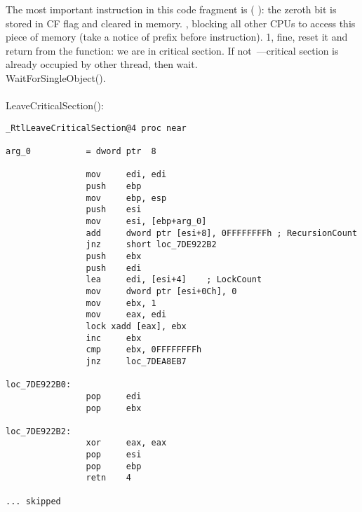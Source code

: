 {The most important instruction in this code fragment is}  
( ): 
{the zeroth bit is stored in CF flag and cleared in memory}.
, 
{blocking all other CPUs to access this piece of memory 
(take a notice of  prefix before  instruction).}
   1, 
{fine, reset it and return from the function: we are in critical section}.
{If not~---critical section is already occupied by other thread, then wait}. \\
 WaitForSingleObject(). \\
\\
 LeaveCriticalSection():

\begin{lstlisting}[caption=Windows 2008/ntdll.dll/x86 (begin)]
_RtlLeaveCriticalSection@4 proc near

arg_0           = dword ptr  8

                mov     edi, edi
                push    ebp
                mov     ebp, esp
                push    esi
                mov     esi, [ebp+arg_0]
                add     dword ptr [esi+8], 0FFFFFFFFh ; RecursionCount
                jnz     short loc_7DE922B2
                push    ebx
                push    edi
                lea     edi, [esi+4]    ; LockCount
                mov     dword ptr [esi+0Ch], 0
                mov     ebx, 1
                mov     eax, edi
                lock xadd [eax], ebx
                inc     ebx
                cmp     ebx, 0FFFFFFFFh
                jnz     loc_7DEA8EB7

loc_7DE922B0:
                pop     edi
                pop     ebx

loc_7DE922B2:
                xor     eax, eax
                pop     esi
                pop     ebp
                retn    4

... skipped
\end{lstlisting}

